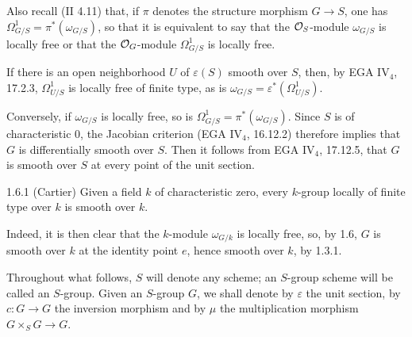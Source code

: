 Also recall (II 4.11) that, if $\pi$ denotes the structure morphism $G\to S$, one has $\Omega^1_{G/S}=\pi^*(\omega_{G/S})$, so that it is equivalent to say that the $\mathcal{O}_S$-module $\omega_{G/S}$ is locally free or that the $\mathcal{O}_G$-module $\Omega^1_{G/S}$ is locally free.

If there is an open neighborhood $U$ of $\varepsilon(S)$ smooth over $S$, then, by EGA IV$_4$, 17.2.3, $\Omega^1_{U/S}$ is locally free of finite type, as is $\omega_{G/S}=\varepsilon^*(\Omega^1_{U/S})$.

Conversely, if $\omega_{G/S}$ is locally free, so is $\Omega^1_{G/S}=\pi^*(\omega_{G/S})$. Since $S$ is of characteristic $0$, the Jacobian criterion (EGA IV$_4$, 16.12.2) therefore implies that $G$ is differentially smooth over $S$. Then it follows from EGA IV$_4$, 17.12.5, that $G$ is smooth over $S$ at every point of the unit section.
\begin{corollary}{1.6.1 (Cartier)}\label{VIB.1.6.1}
Given a field $k$ of characteristic zero, every $k$-group locally of finite type over $k$ is smooth over $k$.
\end{corollary}
Indeed, it is then clear that the $k$-module $\omega_{G/k}$ is locally free, so, by 1.6, $G$ is smooth over $k$ at the identity point $e$, hence smooth over $k$, by 1.3.1.

Throughout what follows, $S$ will denote any scheme; an $S$-group scheme will be called an $S$-group. Given an $S$-group $G$, we shall denote by $\varepsilon$ the unit section, by $c:G\to G$ the inversion morphism and by $\mu$ the multiplication morphism $G\times_SG\to G$.

